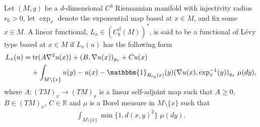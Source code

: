 \documentclass[11pt,reqno]{amsart}
\numberwithin{equation}{section}
\theoremstyle{plain}
\def\Indicator{{\mathbbm{1}}}
\def\Tr{\textnormal{tr}}
\begin{document}
\begin{DEF}\label{def:LevyTypeFunctional}
  Let $(M,g)$ be a $d$-dimensional $C^3$ Riemannian manifold with injectivity radius $r_0>0$, let $\exp_x$ denote the exponential map based at $x \in M$, and fix some $x\in M$.  A linear functional, $L_x\in (C^\beta_b(M))^*$, is said to be a functional of L\'evy type based at $x\in M$ if $L_x(u)$ has the following form
\begin{align}\label{eqIntro:LevyTypeDef}
  L_x(u) & = \Tr(A \nabla^2u(x))+(B, \nabla u(x))_{g_x}+Cu(x)\nonumber\\
   & \;\;\;\;+ \int_{M\setminus\{x\}}u(y)-u(x)-\Indicator_{B_{r_0}(x)}(y)(\nabla u(x),\exp_{x}^{-1}(y))_{g_x} \;\mu(dy),	
\end{align}
where $A:(TM)_x\to (TM)_x$ is a linear self-adjoint map such that $A\geq 0$, $B\in (TM)_x$, $C\in\mathbb{R}$ and $\mu$ is a Borel measure in $M\setminus \{x\}$ such that
\begin{align*}
  \int_{M\setminus \{x\}}\min\{1,d(x,y)^2\} \;\mu(dy).	
\end{align*}	
\end{DEF}
\end{document}
